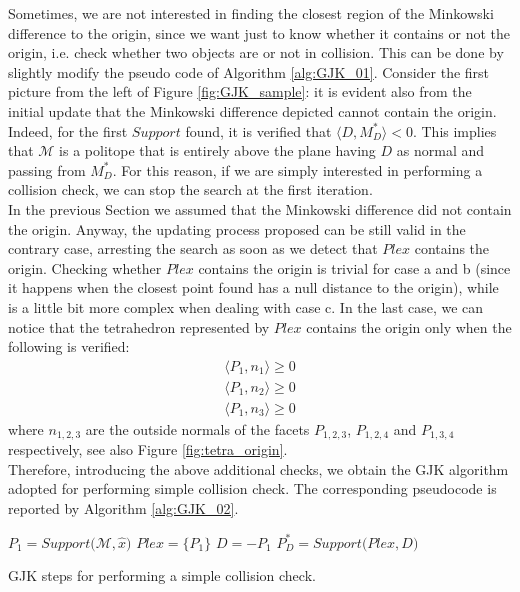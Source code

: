 \documentclass{article}
\begin{document}
Sometimes, we are not interested in finding the closest region of the Minkowski difference to the origin, since we want just to know whether it contains or not the origin, i.e. check whether two objects are or not in collision.
This can be done by slightly modify the pseudo code of Algorithm \ref{alg:GJK_01}. Consider the first picture from the left of Figure \ref{fig:GJK_sample}: it is evident also from the initial update that the Minkowski difference depicted cannot contain the origin. Indeed, for the first $Support$ found, it is verified that $\langle D , M^*_D \rangle < 0$. This implies that $\mathcal{M}$ is a politope that is entirely above the plane having $D$ as normal and passing from $M^*_D$. For this reason, if we are simply interested in performing a collision check, we can stop the search at the first iteration.
\\
In the previous Section we assumed that the Minkowski difference did not contain the origin. Anyway, the updating process proposed can be still valid in the contrary case, arresting the search as soon as we detect that $Plex$ contains the origin. 
Checking whether $Plex$ contains the origin is trivial for case a and b (since it happens when the closest point found has a null distance to the origin), while is a little bit more complex when dealing with case c. In the last case, we can notice that the tetrahedron represented by $Plex$ contains the origin only when the following is verified:
\begin{eqnarray}
\langle P_1 , n_1 \rangle \geq 0 \\
\langle P_1 , n_2 \rangle \geq 0 \\
\langle P_1 , n_3 \rangle \geq 0 
\end{eqnarray}  
where $n_{1,2,3}$ are the outside normals of the facets $P_{1,2,3}$, $P_{1,2,4}$ and $P_{1,3,4}$ respectively, see also Figure \ref{fig:tetra_origin}.
\\
Therefore, introducing the above additional checks, we obtain the GJK algorithm adopted for performing simple collision check. The corresponding pseudocode is reported by Algorithm \ref{alg:GJK_02}.

\begin{algorithm}[H]
$P_1 = Support \bigg(\mathcal{M} , \hat{x} \bigg)$\;
 $Plex = \lbrace P_1 \rbrace$\;
 $D = -P_1$\;
 $P^*_D=Support\bigg(Plex , D\bigg)$\;
\caption{GJK steps for performing a simple collision check.
\label{alg:GJK_02}}
\end{algorithm}
\end{document}
